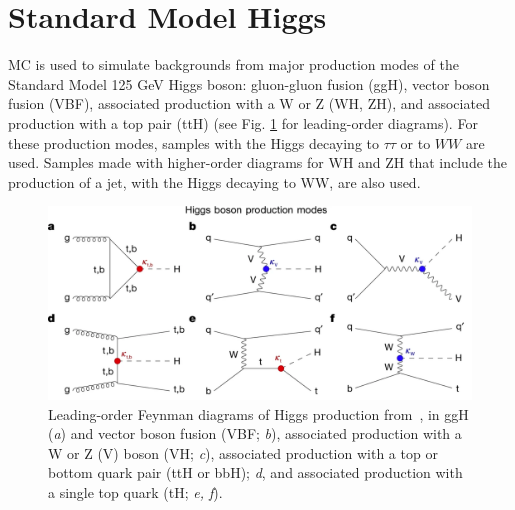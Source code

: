 \section{Standard Model Higgs}
\label{section:background-estimation:SM-higgs}
MC is used to simulate backgrounds from major production modes of the Standard Model 125 GeV Higgs boson: gluon-gluon fusion (ggH), vector boson fusion (VBF), associated production with a W or Z (WH, ZH), and associated production with a top pair (ttH) (see Fig. \ref{fig:higgs-boson-production-modes} for leading-order diagrams). For these production modes, samples with the Higgs decaying to $\tau\tau$ or to $WW$ are used. Samples made with higher-order diagrams for WH and ZH that include the production of a jet, with the Higgs decaying to WW, are also used.

\begin{figure}[ht]
    \centering
    \includegraphics[width=15cm]{figures/ch-7-background-estimation/higgs-boson-production-modes.png}
    \caption[Leading-order Feynman diagrams of Higgs production.]{Leading-order Feynman diagrams of Higgs production from~\cite{CMS-HIG-22-001}, in ggH (\textit{a}) and vector boson fusion (VBF; \textit{b}), associated production with a W or Z (V) boson (VH; \textit{c}), associated production with a top or bottom quark pair (ttH or bbH); \textit{d}, and associated production with a single top quark (tH; \textit{e, f}).} 

     \label{fig:higgs-boson-production-modes}
\end{figure}

